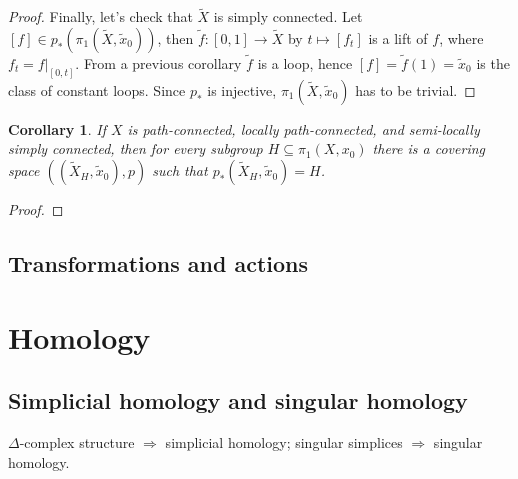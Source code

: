 \documentclass[11pt]{article}
\theoremstyle{definition}
\theoremstyle{plain}
\newtheorem*{corollary}{Corollary}
\theoremstyle{remark}
\begin{document}
\begin{proof}
Finally, let's check that $\widetilde{X}$ is simply connected. Let $[f]\in p_\ast(\pi_1(\widetilde{X},\widetilde{x}_0))$, then $\widetilde{f}:[0,1]\to\widetilde{X}$ by $t\mapsto[f_t]$ is a lift of $f$, where $f_t=f|_{[0,t]}$. From a previous corollary $\widetilde{f}$ is a loop, hence $[f]=\widetilde{f}(1)=\widetilde{x}_0$ is the class of constant loops. Since $p_\ast$ is injective, $\pi_1(\widetilde{X},\widetilde{x}_0)$ has to be trivial.
\end{proof}

\begin{corollary}
If $X$ is path-connected, locally path-connected, and semi-locally simply connected, then for every subgroup $H\subseteq\pi_1(X,x_0)$ there is a covering space $((\widetilde{X}_H,\widetilde{x}_0),p)$ such that $p_\ast(\widetilde{X}_H,\widetilde{x}_0)=H$.
\end{corollary}
\begin{proof}

\end{proof}

\subsection{Transformations and actions}\label{9}


\newpage
\section{Homology}\label{10}

\subsection{Simplicial homology and singular homology}\label{11}

$\Delta$-complex structure $\Rightarrow$ simplicial homology; singular simplices $\Rightarrow$ singular homology.\medbreak
\end{document}
